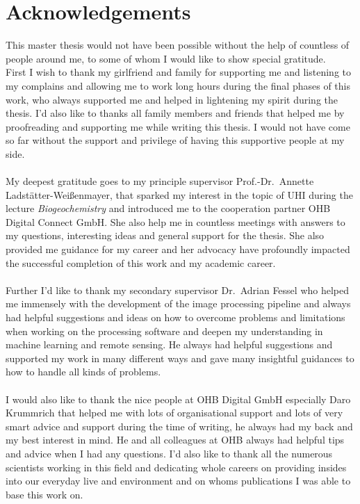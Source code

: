 \section*{Acknowledgements}
This master thesis would not have been possible without the help of countless of people around me, to some of whom I would like to show special gratitude. \\
%
First I wish to thank my girlfriend and family for supporting me and listening to my complains and allowing me to work long hours during the final phases of this work, who always supported me and helped in lightening my spirit during the thesis. 
I'd also like to thanks all family members and friends that helped me by proofreading and supporting me while writing this thesis.
I would not have come so far without the support and privilege of having this supportive people at my side.\\ \\
%
My deepest gratitude goes to my principle supervisor Prof.-Dr.~Annette Ladstätter-Weißenmayer, that sparked my interest in the topic of \gls{UHI} during the lecture \textit{Biogeochemistry} and introduced me to the cooperation partner OHB Digital Connect GmbH. 
She also help me in countless meetings with answers to my questions, interesting ideas and general support for the thesis.
She also provided me guidance for my career and her advocacy have profoundly impacted the successful completion of this work and my academic career.\\ \\
%
Further I'd like to thank my secondary supervisor Dr.\ Adrian Fessel who helped me immensely with the development of the image processing pipeline and always had helpful suggestions and ideas on how to overcome problems and limitations when working on the processing software and deepen my understanding in machine learning and remote sensing. 
He always had helpful suggestions and supported my work in many different ways and gave many insightful guidances to how to handle all kinds of problems.\\ \\
%
I would also like to thank the nice people at OHB Digital GmbH especially Daro Krummrich that helped me with lots of organisational support and lots of very smart advice and support during the time of writing, he always had my back and my best interest in mind. He and all colleagues at OHB always had helpful tips and advice when I had any questions.
%
I'd also like to thank all the numerous scientists working in this field and dedicating whole careers on providing insides into our everyday live and environment and on whoms publications I was able to base this work on. 
\newpage
{}%
